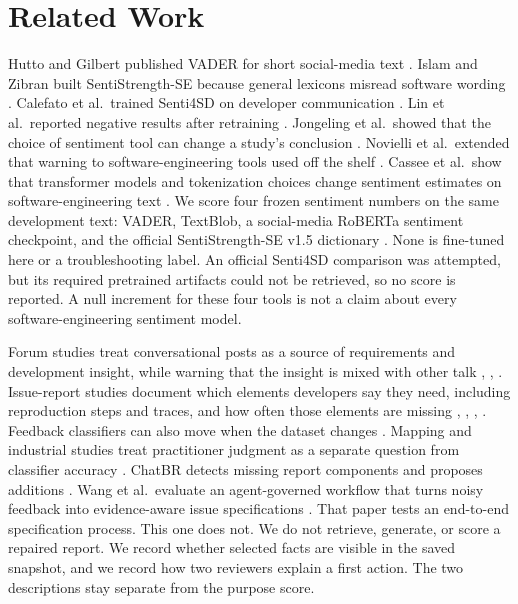 \documentclass[conference,letterpaper]{IEEEtran}
\begin{document}
\section{Related Work}
Hutto and Gilbert published VADER for short social-media text \cite{Hutto2014VADER}. Islam and Zibran built SentiStrength-SE because general lexicons misread software wording \cite{Islam2018SentiStrengthSE}. Calefato et al.\ trained Senti4SD on developer communication \cite{Calefato2018Senti4SD}. Lin et al.\ reported negative results after retraining \cite{Lin2018HowFar}. Jongeling et al.\ showed that the choice of sentiment tool can change a study's conclusion \cite{Jongeling2017Negative}. Novielli et al.\ extended that warning to software-engineering tools used off the shelf \cite{Novielli2021Replication}. Cassee et al.\ show that transformer models and tokenization choices change sentiment estimates on software-engineering text \cite{Cassee2024Transformers}. We score four frozen sentiment numbers on the same development text: VADER, TextBlob, a social-media RoBERTa sentiment checkpoint, and the official SentiStrength-SE v1.5 dictionary \cite{SentiStrengthSETool}. None is fine-tuned here or a troubleshooting label. An official Senti4SD comparison was attempted, but its required pretrained artifacts could not be retrieved, so no score is reported. A null increment for these four tools is not a claim about every software-engineering sentiment model.

Forum studies treat conversational posts as a source of requirements and development insight, while warning that the insight is mixed with other talk \cite{Tizard2019Forums}, \cite{Wang2024Forums}, \cite{Iqbal2021Reddit}. Issue-report studies document which elements developers say they need, including reproduction steps and traces, and how often those elements are missing \cite{Bettenburg2008GoodReport}, \cite{Chaparro2017Missing}, \cite{Soltani2020Elements}, \cite{Wang2025InformationNeeds}. Feedback classifiers can also move when the dataset changes \cite{Devine2023Transfer}. Mapping and industrial studies treat practitioner judgment as a separate question from classifier accuracy \cite{Laiq2026Mapping}. ChatBR detects missing report components and proposes additions \cite{Bo2024ChatBR}. Wang et al.\ evaluate an agent-governed workflow that turns noisy feedback into evidence-aware issue specifications \cite{Wang2026Evidence}. That paper tests an end-to-end specification process. This one does not. We do not retrieve, generate, or score a repaired report. We record whether selected facts are visible in the saved snapshot, and we record how two reviewers explain a first action. The two descriptions stay separate from the purpose score.
\end{document}
